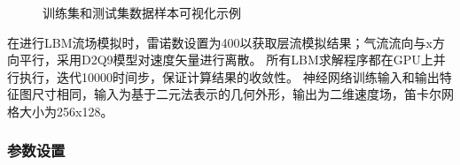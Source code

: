 \begin{figure}[htb]
	\centering
	 \qquad
	\caption{训练集和测试集数据样本可视化示例}
	\label{fig:sample}
\end{figure}

在进行LBM流场模拟时，雷诺数设置为400以获取层流模拟结果；气流流向与x方向平行，采用D2Q9模型对速度矢量进行离散。
所有LBM求解程序都在GPU上并行执行，迭代10000时间步，保证计算结果的收敛性。
神经网络训练输入和输出特征图尺寸相同，输入为基于二元法表示的几何外形，输出为二维速度场，笛卡尔网格大小为256x128。


\subsubsection{参数设置}

